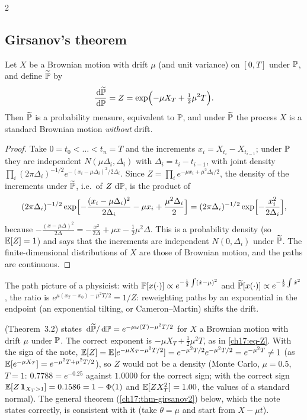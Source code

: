 \begin{paracol}{2}
\subsection{Girsanov's theorem}
\begin{theorem}\label{ch17:thm-girsanov1}
Let $X$ be a Brownian motion with drift $\mu$ (and unit variance) on $[0,T]$ under $\mathbb{P}$, and define $\widetilde{\mathbb{P}}$ by
\begin{equation}\label{ch17:eq-Z}
  \frac{\,\mathrm{d}\widetilde{\mathbb{P}}}{\,\mathrm{d}\mathbb{P}}=Z=\exp\Bigl(-\mu X_T+\tfrac12\mu^2T\Bigr).
\end{equation}
Then $\widetilde{\mathbb{P}}$ is a probability measure, equivalent to $\mathbb{P}$, and under $\widetilde{\mathbb{P}}$ the process $X$ is a standard Brownian motion \emph{without} drift.
\end{theorem}
\begin{proof}
Take $0=t_0<\dots<t_n=T$ and the increments $x_i=X_{t_i}-X_{t_{i-1}}$; under $\mathbb{P}$ they are independent $N(\mu\Delta_i,\Delta_i)$ with $\Delta_i=t_i-t_{i-1}$, with joint density $\prod_i(2\pi\Delta_i)^{-1/2}e^{-(x_i-\mu\Delta_i)^2/2\Delta_i}$. Since $Z=\prod_ie^{-\mu x_i+\mu^2\Delta_i/2}$,
the density of the increments under $\widetilde{\mathbb{P}}$, i.e.\ of $Z\,\,\mathrm{d}\mathbb{P}$, is the product of
\[
  (2\pi\Delta_i)^{-1/2}\exp\Bigl[-\frac{(x_i-\mu\Delta_i)^2}{2\Delta_i}-\mu x_i+\frac{\mu^2\Delta_i}2\Bigr]=(2\pi\Delta_i)^{-1/2}\exp\Bigl[-\frac{x_i^2}{2\Delta_i}\Bigr],
\]
because $-\tfrac{(x-\mu\Delta)^2}{2\Delta}=-\tfrac{x^2}{2\Delta}+\mu x-\tfrac12\mu^2\Delta$. This is a probability density (so $\mathbb{E}[Z]=1$) and says that the increments are independent $N(0,\Delta_i)$ under $\widetilde{\mathbb{P}}$. The finite-dimensional distributions of $X$ are those of Brownian motion, and the paths are continuous.
\end{proof}
The path picture of a physicist: with $\mathbb{P}[x(\cdot)]\propto e^{-\frac12\int(\dot x-\mu)^2}$ and $\widetilde{\mathbb{P}}[x(\cdot)]\propto e^{-\frac12\int\dot x^2}$, the ratio is $e^{\mu(x_T-x_0)-\mu^2T/2}=1/Z$: reweighting paths by an exponential in the endpoint (an exponential tilting, or Cameron--Martin) shifts the drift.

\begin{coursenote}
 (Theorem~3.2) states $\,\mathrm{d}\widetilde{\mathbb{P}}/\,\mathrm{d}\mathbb{P}=e^{-\mu\omega(T)-\mu^2T/2}$ for $X$ a Brownian motion with drift $\mu$ under $\mathbb{P}$. The correct exponent is $-\mu X_T\,\mathbf{+}\,\tfrac12\mu^2T$, as in \eqref{ch17:eq-Z}. With the sign of the note,
$\mathbb{E}[Z]=\mathbb{E}[e^{-\mu X_T-\mu^2T/2}]=e^{-\mu^2T/2}e^{-\mu^2T/2}=e^{-\mu^2T}\neq1$ (as $\mathbb{E}[e^{-\mu X_T}]=e^{-\mu^2T+\mu^2T/2}$), so $Z$ would not be a density (Monte Carlo, $\mu=0.5$, $T=1$: $0.7788=e^{-0.25}$ against $1.0000$ for the correct sign; with the correct sign $\mathbb{E}[Z\,\mathbf{1}_{X_T>1}]=0.1586=1-\Phi(1)$ and $\mathbb{E}[ZX_T^2]=1.00$, the values of a standard normal).
The general theorem (\cref{ch17:thm-girsanov2}) below, which the note states correctly, is consistent with it (take $\theta=\mu$ and start from $X-\mu t$).
\end{coursenote}


\end{paracol}
